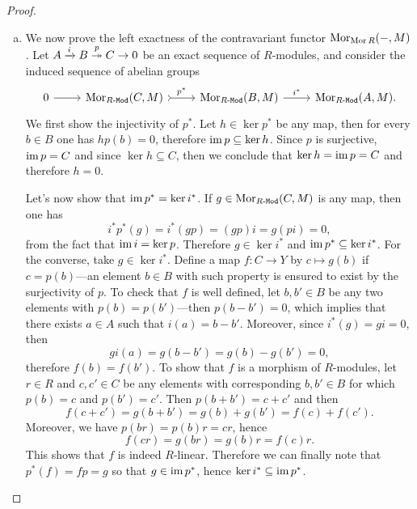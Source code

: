 \begin{proof}
\begin{enumerate}[(a)]
\item We now prove the left exactness of the contravariant functor
  \(\operatorname{Mor}_{\operatorname{Mor}{R}}(-, M)\). Let \(A \xrightarrow i B \overset{p}{\twoheadrightarrow} C \to 0\)
  be an exact sequence of \(R\)-modules, and consider the induced sequence of
  abelian groups
  \[
  \begin{tikzcd}
  0 \ar[r] &\Hom_{\Mod{R}}(C, M) \ar[r, tail, "p^{*}"] &\Hom_{\Mod{R}}(B, M)
  \ar[r, "i^{*}"] &\Hom_{\Mod{R}}(A, M).
  \end{tikzcd}
  \]
  We first show the injectivity of \(p^{*}\). Let \(h \in \ker p^{*}\) be any
  map, then for every \(b \in B\) one has \(h p(b) = 0\), therefore
  \(\operatorname{im} p \subseteq \ker h\). Since \(p\) is surjective, \(\operatorname{im} p = C\) and since
  \(\ker h \subseteq C\), then we conclude that \(\ker h = \operatorname{im} p = C\) and
  therefore \(h = 0\).

  Let's now show that \(\operatorname{im} p^{*} = \ker i^{*}\). If
  \(g \in \operatorname{Mor}_{{R\text{-}\texttt{Mod}}}(C, M)\) is any map, then one has
  \[
  i^{*} p^{*}(g) = i^{*}(g p) = (g p) i = g (p i) = 0,
  \]
  from the fact that \(\operatorname{im} i = \ker p\). Therefore \(g \in \ker i^{*}\) and
  \(\operatorname{im} p^{*} \subseteq \ker i^{*}\). For the converse, take
  \(g \in \ker i^{*}\). Define a map \(f: C \to Y\) by \(c \mapsto g(b)\) if
  \(c = p(b)\)---an element \(b \in B\) with such property is ensured to exist
  by the surjectivity of \(p\). To check that \(f\) is well defined, let
  \(b, b' \in B\) be any two elements with \(p(b) = p(b')\)---then
  \(p(b - b') = 0\), which implies that there exists \(a \in A\) such that
  \(i(a) = b - b'\). Moreover, since \(i^{*}(g) = g i = 0\), then
  \[
  g i(a) = g(b - b') = g(b) - g(b') = 0,
  \]
  therefore \(f(b) = f(b')\). To show that \(f\) is a morphism of \(R\)-modules,
  let \(r \in R\) and \(c, c' \in C\) be any elements with corresponding
  \(b, b' \in B\) for which \(p(b) = c\) and \(p(b') = c'\). Then
  \(p(b + b') = c + c'\) and then
  \[
  f(c + c') = g(b + b') = g(b) + g(b') = f(c) + f(c').
  \]
  Moreover, we have \(p(b r) = p(b) r = c r\), hence
  \[
  f(c r) = g(b r) = g(b) r = f(c) r.
  \]
  This shows that \(f\) is indeed \(R\)-linear. Therefore we can finally note
  that \(p^{*}(f) = f p = g\) so that \(g \in \operatorname{im} p^{*}\), hence
  \(\ker i^{*} \subseteq \operatorname{im} p^{*}\).
\end{enumerate}
\end{proof}

